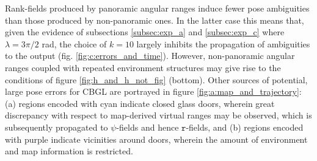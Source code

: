 Rank-fields produced by panoramic angular ranges induce fewer pose ambiguities
than those produced by non-panoramic ones. In the latter case this means that,
given the evidence of subsections \ref{subsec:exp_a} and \ref{subsec:exp_c}
where $\lambda = 3\pi/2$ rad, the choice of $k=10$ largely inhibits the
propagation of ambiguities to the output (fig.  \ref{fig:c:errors_and_time}).
However, non-panoramic angular ranges coupled with repeated environment
structures may give rise to the conditions of figure \ref{fig:h_and_h_not_fig}
(bottom). Other sources of potential, large pose errors for CBGL are portrayed
in figure \ref{fig:a:map_and_trajectory}: (a) regions encoded with cyan
indicate closed glass doors, wherein great discrepancy with respect to
map-derived virtual ranges may be observed, which is subsequently propagated to
$\psi$-fields and hence $\texttt{r}$-fields, and (b) regions encoded with
purple indicate vicinities around doors, wherein the amount of environment and
map information is restricted.

